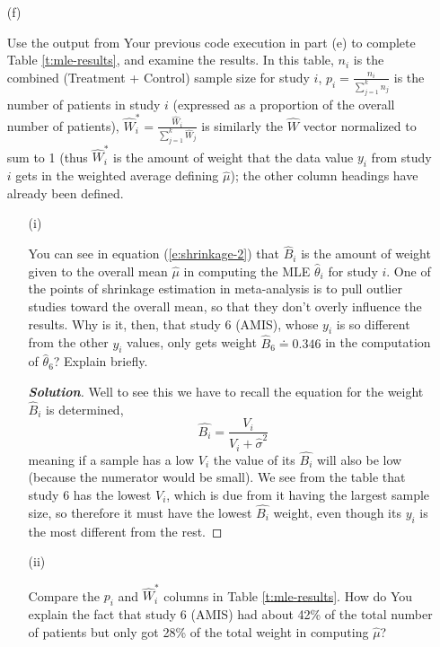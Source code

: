 \documentclass[12pt]{article}
\newenvironment{solution}{\begin{tcolorbox}[breakable]\begin{proof}[\textbf{\textit{Solution}}] }{\end{proof}\end{tcolorbox}}
\begin{document}
\begin{itemize}

\item[(f)]

\textit{} \vspace*{0.025in} Use the output from Your previous code execution in part (e) to complete Table \ref{t:mle-results}, and examine the results. In this table, $n_i$ is the combined (Treatment + Control) sample size for study $i$, $p_i = \frac{ n_i }{ \sum_{ j = 1 }^k n_j }$ is the number of patients in study $i$ (expressed as a proportion of the overall number of patients), $\hat{ W }_i^* = \frac{ \hat{ W }_i }{ \sum_{ j = 1 }^k \hat{ W }_j }$ is similarly the $\hat{ W }$ vector normalized to sum to 1 (thus $\hat{ W }_i^*$ is the amount of weight that the data value $y_i$ from study $i$ gets in the weighted average defining $\hat{ \mu }$); the other column headings have already been defined.

\begin{itemize}

\item[(i)]

You can see in equation (\ref{e:shrinkage-2}) that $\hat{ B }_i$ is the amount of weight given to the overall mean $\hat{ \mu }$ in computing the MLE $\hat{ \theta }_i$ for study $i$. One of the points of shrinkage estimation in meta-analysis is to pull outlier studies toward the overall mean, so that they don't overly influence the results. Why is it, then, that study 6 (AMIS), whose $y_i$ is so different from the other $y_i$ values, only gets weight $\hat{ B }_6 \doteq 0.346$ in the computation of $\hat{ \theta }_6$? Explain briefly. \textit{\fbox{\textbf{[10 points]}}}

\begin{solution}
    Well to see this we have to recall the equation for the weight $\hat{B}_i$ is determined,
    \[\hat{B_i} = \dfrac{V_i}{V_i + \hat{\sigma}^{2}}\]
    meaning if a sample has a low $V_i$ the value of its $\hat{B_i}$ will also be low (because the numerator would be small). We see from the table that study 6 has the lowest $V_i$, which is due from it having the largest sample size, so therefore it must have the lowest $\hat{B_i}$ weight, even though its $y_i$ is the most different from the rest. 
\end{solution}

\item[(ii)]

Compare the $p_i$ and $\hat{ W }_i^*$ columns in Table \ref{t:mle-results}. How do You explain the fact that study 6 (AMIS) had about 42\% of the total number of patients but only got 28\% of the total weight in computing $\hat{ \mu }$? \textit{\fbox{\textbf{[10 points]}}}


\end{itemize}
\end{itemize}
\end{document}
